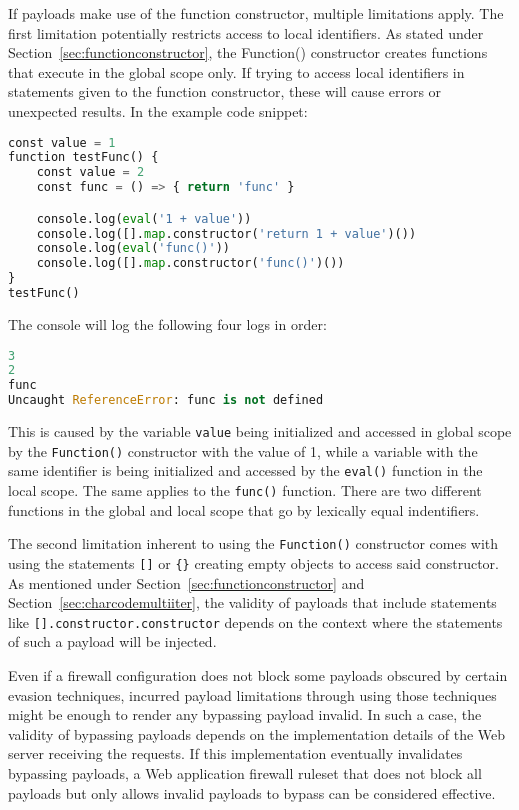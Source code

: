 If payloads make use of the function constructor, multiple limitations apply. The first limitation potentially restricts access to local identifiers. As stated under Section~\ref{sec:functionconstructor}, the Function() constructor creates functions that execute in the global scope only. If trying to access local identifiers in statements given to the function constructor, these will cause errors or unexpected results. In the example code snippet:

\begin{lstlisting}[style=basicStyle, language=Python]
const value = 1
function testFunc() {
	const value = 2
	const func = () => { return 'func' }

	console.log(eval('1 + value'))
	console.log([].map.constructor('return 1 + value')())
	console.log(eval('func()'))
	console.log([].map.constructor('func()')())
}
testFunc()
\end{lstlisting}

The console will log the following four logs in order:

\begin{lstlisting}[style=basicStyle, language=Python]
3 
2 
func 
Uncaught ReferenceError: func is not defined
\end{lstlisting}

This is caused by the variable \verb|value| being initialized and accessed in global scope by the \verb|Function()| constructor with the value of 1, while a variable with the same identifier is being initialized and accessed by the \verb|eval()| function in the local scope. The same applies to the \verb|func()| function. There are two different functions in the global and local scope that go by lexically equal indentifiers.

The second limitation inherent to using the \verb|Function()| constructor comes with using the statements \verb|[]| or \verb|{}| creating empty objects to access said constructor. As mentioned under Section~\ref{sec:functionconstructor} and Section~\ref{sec:charcodemultiiter}, the validity of payloads that include statements like \verb|[].constructor.constructor| depends on the context where the statements of such a payload will be injected. 


Even if a firewall configuration does not block some payloads obscured by certain evasion techniques, incurred payload limitations through using those techniques might be enough to render any bypassing payload invalid. In such a case, the validity of bypassing payloads depends on the implementation details of the Web server receiving the requests. If this implementation eventually invalidates bypassing payloads, a Web application firewall ruleset that does not block all payloads but only allows invalid payloads to bypass can be considered effective.
